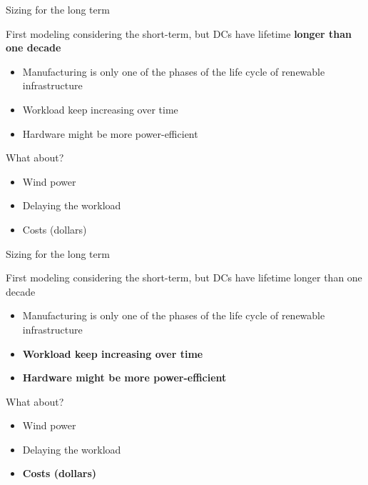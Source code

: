 \documentclass[Ligatures=TeX,table,svgnames,usetotalslideindicator,compress,10pt,aspectratio=169]{beamer}
\begin{document}
\begin{frame}{Sizing for the long term}

First modeling considering the short-term, but DCs have lifetime \textbf{longer than one decade} 

\begin{itemize}  
    \item Manufacturing is only one of the phases of the life cycle of renewable infrastructure
    \item Workload keep increasing over time
    \item Hardware might be more power-efficient
    
\end{itemize}  

What about?
\begin{itemize} 
  \item Wind power
  \item Delaying the workload
  \item Costs (dollars)
\end{itemize}

\end{frame}
\addtocounter{framenumber}{-1}

\begin{frame}{Sizing for the long term}

First modeling considering the short-term, but DCs have lifetime longer than one decade
\begin{itemize}  
    \item Manufacturing is only one of the phases of the life   cycle of renewable infrastructure
    \item \textbf{\alert{Workload keep increasing over time}}
    \item \textbf{\alert{Hardware might be more power-efficient}}

\end{itemize}  

What about?
\begin{itemize} 
  \item Wind power
  \item Delaying the workload
  \item \textbf{\alert{Costs (dollars)}}
\end{itemize}

\end{frame}
\end{document}
